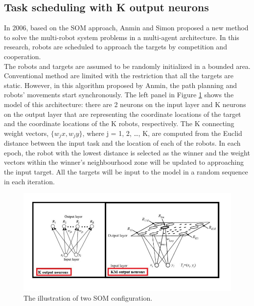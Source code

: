 \subsection{Task scheduling with K output neurons}
In 2006, based on the SOM approach, Anmin and Simon proposed a new method to solve the multi-robot system problems in a multi-agent architecture\cite{zhu2006k}. In this research, robots are scheduled to approach the targets by competition and cooperation. 
\\
The robots and targets are assumed to be randomly initialized in a bounded area. Conventional method are limited with the restriction that all the targets are static. However, in this algorithm proposed by Anmin, the path planning and robots’ movements start synchronously. The left panel in Figure \ref{fig-2} shows the model of this architecture: there are 2 neurons on the input layer and K neurons on the output layer that are representing the coordinate locations of the target and the coordinate locations of the K robots, respectively. The K connecting weight vectors, $\{w_jx , w_jy\}$, where j = 1, 2, …, K, are computed from the Euclid distance between the input task and the location of each of the robots. In each epoch, the robot with the lowest distance is selected as the winner and the weight vectors within the winner’s neighbourhood zone will be updated to approaching the input target. All the targets will be input to the model in a random sequence in each iteration.

\begin{figure}[h]
  \centering
  \includegraphics[width=15cm]{Pictures/SimonAmin2Methods.JPG}
  \caption{The illustration of two SOM configuration\cite{zhu2006neural,zhu2006k}.}
  
  \label{fig-2}
\end{figure}

